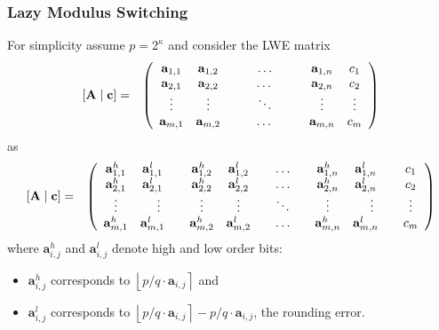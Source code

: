 \documentclass[10pt]{beamer}
\renewcommand{\vec}[1]{\mathbf{#1}\xspace}
\newcommand{\round}[1]{\ensuremath{\left\lfloor{#1}\right\rceil}\xspace}
\begin{document}
\begin{frame}
\frametitle{Lazy Modulus Switching} 
For simplicity assume $p = 2^\kappa$ and consider the LWE matrix
\begin{eqnarray*}
\footnotesize
[\vec{A} \mid \vec{c}] &=& \left(\begin{array}{ccccc}
       \vec{a}_{1,1} & \vec{a}_{1,2} & \hspace{2em} \dots \hspace{2em} & \vec{a}_{1,n} & c_1\\
       \vec{a}_{2,1} & \vec{a}_{2,2} & \dots & \vec{a}_{2,n} & c_2\\
        \vdots & \vdots & \ddots & \vdots & \vdots\\
       \vec{a}_{m,1} & \vec{a}_{m,2} & \dots & \vec{a}_{m,n} & c_{m}\\
      \end{array}\right)\\
\end{eqnarray*}
as
\begin{eqnarray*}
\footnotesize
[\vec{A} \mid \vec{c}] & = & \left(\begin{array}{cccccccc}
       \vec{a}_{1,1}^h & \vec{a}_{1,1}^{l} \hspace{1em} & \vec{a}_{1,2}^h & \vec{a}_{1,2}^{l} & \hspace{1em} \dots \hspace{1em} & \vec{a}_{1,n}^h & \vec{a}_{1,n}^{l}  \hspace{1em} & c_1\\
       \vec{a}_{2,1}^h & \vec{a}_{2,1}^{l} \hspace{1em} & \vec{a}_{2,2}^h & \vec{a}_{2,2}^{l} & \hspace{1em} \dots \hspace{1em} & \vec{a}_{2,n}^h & \vec{a}_{2,n}^{l}  \hspace{1em} & c_2\\
        \vdots & \vdots & \vdots & \vdots & \ddots & \vdots & \vdots & \vdots\\
       \vec{a}_{m,1}^h & \vec{a}_{m,1}^{l} \hspace{1em} & \vec{a}_{m,2}^h & \vec{a}_{m,2}^{l} & \hspace{1em} \dots \hspace{1em} & \vec{a}_{m,n}^h & \vec{a}_{m,n}^{l}  \hspace{1em} & c_{m}\\
      \end{array}\right)\\
\end{eqnarray*}
where $\vec{a}_{i,j}^h$ and $\vec{a}_{i,j}^{l}$ denote high and low order bits:
\begin{itemize}
 \item $\vec{a}_{i,j}^h$ corresponds to $\round{p/q \cdot \vec{a}_{i,j}}$ and 
 \item $\vec{a}_{i,j}^l$ corresponds to $\round{p/q \cdot \vec{a}_{i,j}} - p/q \cdot \vec{a}_{i,j}$, the rounding error.
\end{itemize}


\end{frame}
\end{document}
